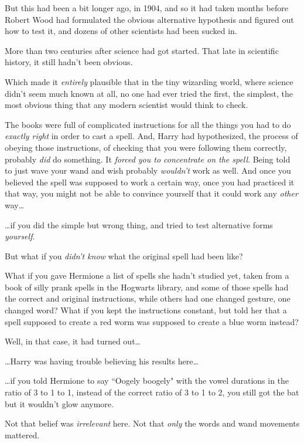 But this had been a bit longer ago, in 1904, and so it had taken months before Robert Wood had formulated the obvious alternative hypothesis and figured out how to test it, and dozens of other scientists had been sucked in.

More than two centuries after science had got started. That late in scientific history, it still hadn't been obvious.

Which made it \emph{entirely} plausible that in the tiny wizarding world, where science didn't seem much known at all, no one had ever tried the first, the simplest, the most obvious thing that any modern scientist would think to check.

The books were full of complicated instructions for all the things you had to do \emph{exactly right} in order to cast a spell. And, Harry had hypothesized, the process of obeying those instructions, of checking that you were following them correctly, probably \emph{did} do something. It \emph{forced you to concentrate on the spell}. Being told to just wave your wand and wish probably \emph{wouldn't} work as well. And once you believed the spell was supposed to work a certain way, once you had practiced it that way, you might not be able to convince yourself that it could work any \emph{other} way{\ldots}

{\ldots}if you did the simple but wrong thing, and tried to test alternative forms \emph{yourself}.

But what if you \emph{didn't know} what the original spell had been like?

What if you gave Hermione a list of spells she hadn't studied yet, taken from a book of silly prank spells in the Hogwarts library, and some of those spells had the correct and original instructions, while others had one changed gesture, one changed word? What if you kept the instructions constant, but told her that a spell supposed to create a red worm was supposed to create a blue worm instead?

Well, in that case, it had turned out{\ldots}

{\ldots}Harry was having trouble believing his results here{\ldots}

{\ldots}if you told Hermione to say ``Oogely boogely" with the vowel durations in the ratio of 3 to 1 to 1, instead of the correct ratio of 3 to 1 to 2, you still got the bat but it wouldn't glow anymore.

Not that belief was \emph{irrelevant} here. Not that \emph{only} the words and wand movements mattered.


